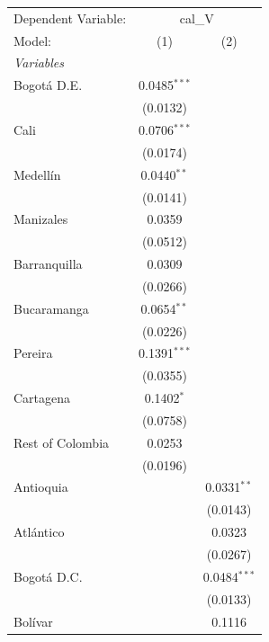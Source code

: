 
\begingroup
\centering
\begin{tabular}{lcc}
   \tabularnewline \midrule \midrule
   Dependent Variable: & \multicolumn{2}{c}{cal\_V}\\
   Model:             & (1)            & (2)\\  
   \midrule
   \emph{Variables}\\
   Bogotá D.E.        & 0.0485$^{***}$ &   \\   
                      & (0.0132)       &   \\   
   Cali               & 0.0706$^{***}$ &   \\   
                      & (0.0174)       &   \\   
   Medellín           & 0.0440$^{**}$  &   \\   
                      & (0.0141)       &   \\   
   Manizales          & 0.0359         &   \\   
                      & (0.0512)       &   \\   
   Barranquilla       & 0.0309         &   \\   
                      & (0.0266)       &   \\   
   Bucaramanga        & 0.0654$^{**}$  &   \\   
                      & (0.0226)       &   \\   
   Pereira            & 0.1391$^{***}$ &   \\   
                      & (0.0355)       &   \\   
   Cartagena          & 0.1402$^{*}$   &   \\   
                      & (0.0758)       &   \\   
   Rest of Colombia   & 0.0253         &   \\   
                      & (0.0196)       &   \\   
   Antioquia          &                & 0.0331$^{**}$\\   
                      &                & (0.0143)\\   
   Atlántico          &                & 0.0323\\   
                      &                & (0.0267)\\   
   Bogotá D.C.        &                & 0.0484$^{***}$\\   
                      &                & (0.0133)\\   
   Bolívar            &                & 0.1116\\   

\end{tabular}
